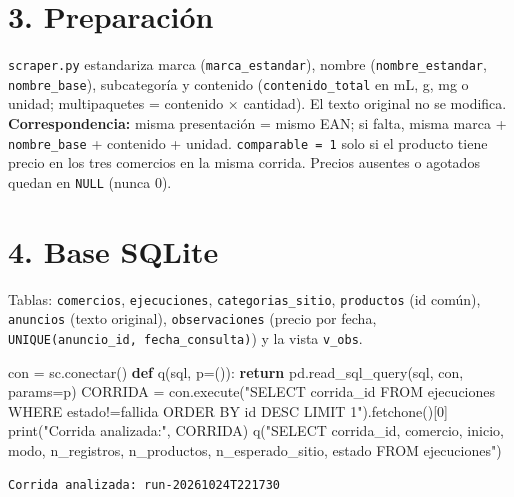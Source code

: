 \documentclass[
  spanish,
  letterpaper,
  DIV=11,
  numbers=noendperiod]{scrartcl}
\newenvironment{Shaded}{\begin{snugshade}}{\end{snugshade}}
\newcommand{\BuiltInTok}[1]{\textcolor[rgb]{0.00,0.23,0.31}{#1}}
\newcommand{\ControlFlowTok}[1]{\textcolor[rgb]{0.00,0.23,0.31}{\textbf{#1}}}
\newcommand{\DecValTok}[1]{\textcolor[rgb]{0.68,0.00,0.00}{#1}}
\newcommand{\KeywordTok}[1]{\textcolor[rgb]{0.00,0.23,0.31}{\textbf{#1}}}
\newcommand{\NormalTok}[1]{\textcolor[rgb]{0.00,0.23,0.31}{#1}}
\newcommand{\OperatorTok}[1]{\textcolor[rgb]{0.37,0.37,0.37}{#1}}
\newcommand{\StringTok}[1]{\textcolor[rgb]{0.13,0.47,0.30}{#1}}
\begin{document}
\section{3. Preparación}\label{preparaciuxf3n}

\texttt{scraper.py} estandariza marca (\texttt{marca\_estandar}), nombre
(\texttt{nombre\_estandar}, \texttt{nombre\_base}), subcategoría y
contenido (\texttt{contenido\_total} en mL, g, mg o unidad;
multipaquetes = contenido × cantidad). El texto original no se modifica.
\textbf{Correspondencia:} misma presentación = mismo EAN; si falta,
misma marca + \texttt{nombre\_base} + contenido + unidad.
\texttt{comparable\ =\ 1} solo si el producto tiene precio en los tres
comercios en la misma corrida. Precios ausentes o agotados quedan en
\texttt{NULL} (nunca 0).

\section{4. Base SQLite}\label{base-sqlite}

Tablas: \texttt{comercios}, \texttt{ejecuciones},
\texttt{categorias\_sitio}, \texttt{productos} (id común),
\texttt{anuncios} (texto original), \texttt{observaciones} (precio por
fecha, \texttt{UNIQUE(anuncio\_id,\ fecha\_consulta)}) y la vista
\texttt{v\_obs}.

\begin{Shaded}
\begin{Highlighting}[]
\NormalTok{con }\OperatorTok{=}\NormalTok{ sc.conectar()}
\KeywordTok{def}\NormalTok{ q(sql, p}\OperatorTok{=}\NormalTok{()):}
    \ControlFlowTok{return}\NormalTok{ pd.read\_sql\_query(sql, con, params}\OperatorTok{=}\NormalTok{p)}
\NormalTok{CORRIDA }\OperatorTok{=}\NormalTok{ con.execute(}\StringTok{"SELECT corrida\_id FROM ejecuciones WHERE estado!=\textquotesingle{}fallida\textquotesingle{} ORDER BY id DESC LIMIT 1"}\NormalTok{).fetchone()[}\DecValTok{0}\NormalTok{]}
\BuiltInTok{print}\NormalTok{(}\StringTok{"Corrida analizada:"}\NormalTok{, CORRIDA)}
\NormalTok{q(}\StringTok{"SELECT corrida\_id, comercio, inicio, modo, n\_registros, n\_productos, n\_esperado\_sitio, estado FROM ejecuciones"}\NormalTok{)}
\end{Highlighting}
\end{Shaded}

\begin{verbatim}
Corrida analizada: run-20261024T221730
\end{verbatim}
\end{document}
